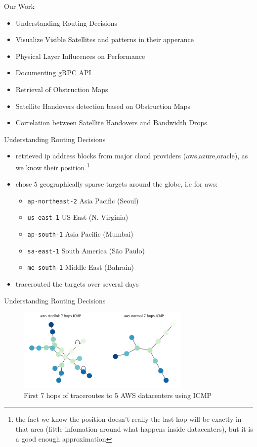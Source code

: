 \documentclass[NET,english,beameralt]{tumbeamer}
\begin{document}
\begin{frame}{Our Work}
	\begin{itemize}
		\item Understanding Routing Decisions
		\item Visualize Visible Satellites and patterns in their apperance
		\item Physical Layer Influcences on Performance
		\item Documenting gRPC API
		\item Retrieval of Obstruction Maps
		\item Satellite Handovers detection based on Obstruction Maps
		\item Correlation between Satellite Handovers and Bandwidth Drops	
	\end{itemize}
\end{frame}

\begin{frame}{Understanding Routing Decisions}
	\begin{itemize}
		\item retrieved ip address blocks from major cloud providers (aws,azure,oracle), as we know their position
			\footnote{the fact we know the position doesn't really the last hop will be exactly in that area (little infomation around
            what happens inside datacenters), but it is a good enough approximation}
		\item chose 5 geographically sparse targets around the globe, i.e for aws:
            \begin{itemize}
                \item \texttt{ap-northeast-2} Asia Pacific (Seoul)
                \item \texttt{us-east-1} US East (N. Virginia)
                \item \texttt{ap-south-1} Asia Pacific (Mumbai)
                \item \texttt{sa-east-1} South America (São Paulo)
                \item \texttt{me-south-1} Middle East (Bahrain)
            \end{itemize}
    	\item tracerouted the targets over several days 
	\end{itemize}
\end{frame}

\begin{frame}{Understanding Routing Decisions}
	\begin{figure}
    	\includegraphics[width=0.75\textwidth]{pics/aws_7_icmp.png}
    	\caption[short]{First 7 hops of traceroutes to 5 AWS datacenters using ICMP}
	\end{figure}
\end{frame}
\end{document}
